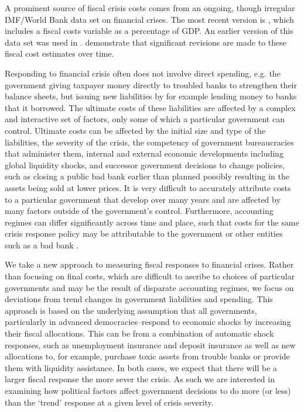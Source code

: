 \documentclass[]{article}
\begin{document}
A prominent source of fiscal crisis costs comes from an ongoing, though irregular IMF/World Bank data set on financial crises. The most recent version is \cite{laeven2013}, which includes a fiscal costs variable as a percentage of GDP. An earlier version of this data set was used in \cite{Keefer2007}. \cite{GandrudHallerberg2015} demonstrate that significant revisions are made to these fiscal cost estimates over time.

Responding to financial crisis often does not involve direct spending, e.g. the government giving taxpayer money directly to troubled banks to strengthen their balance sheets, but issuing new liabilities by for example lending money to banks that it borrowed. The ultimate costs of these liabilities are affected by a complex and interactive set of factors, only some of which a particular government can control. Ultimate costs can be affected by the initial size and type of the liabilities, the severity of the crisis, the competency of government bureaucracies that administer them, internal and external economic developments including global liquidity shocks, and successor government decisions to change policies, such as closing a public bad bank earlier than planned possibly resulting in the assets being sold at lower prices. It is very difficult to accurately attribute costs to a particular government that develop over many years and are affected by many factors outside of the government's control. Furthermore, accounting regimes can differ significantly across time and place, such that costs for the same crisis response policy may be attributable to the government or other entities such as a bad bank \citep{gandrudHallerbergWEP}.

We take a new approach to measuring fiscal responses to financial crises. Rather than focusing on final costs, which are difficult to ascribe to choices of particular governments and may be the result of disparate accounting regimes, we focus on deviations from trend changes in government liabilities and spending. This approach is based on the underlying assumption that all governments, particularly in advanced democracies--respond to economic shocks by increasing their fiscal allocations. This can be from a combination of automatic shock responses, such as unemployment insurance and deposit insurance as well as new allocations to, for example, purchase toxic assets from trouble banks or provide them with liquidity assistance. In both cases, we expect that there will be a larger fiscal response the more sever the crisis. As such we are interested in examining how political factors affect government decisions to do more (or less) than the `trend' response at a given level of crisis severity.
\end{document}
